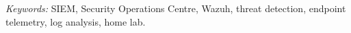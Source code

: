 \documentclass[11pt,a4paper]{article}
\begin{document}
\vspace{1em}
\noindent\textit{Keywords:} SIEM, Security Operations Centre, Wazuh, threat
detection, endpoint telemetry, log analysis, home lab.

\newpage
\tableofcontents
\newpage









\newpage


\end{document}
